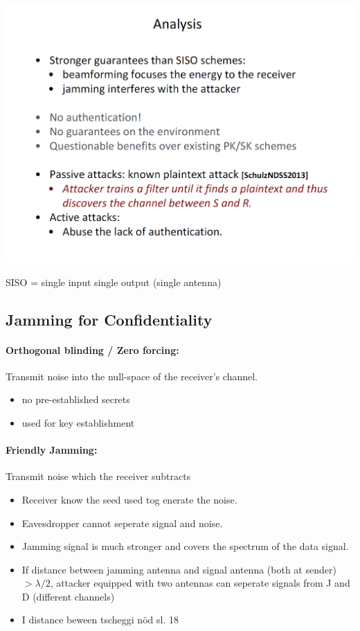 \begin{minipage}{\linewidth}
    \centering      
    \includegraphics[width=\linewidth]{Figures/L7_secrecy_analysis.PNG} 
\end{minipage}
SISO = single input single output (single antenna)

\subsection{Jamming for Confidentiality}

\paragraph{Orthogonal blinding / Zero forcing:}
Transmit noise into the null-space of the receiver's channel.
\begin{itemize}
    \item no pre-established secrets
    \item used for key establishment
\end{itemize}

\paragraph{Friendly Jamming:}
Transmit noise which the receiver subtracts
\begin{itemize}
    \item Receiver know the seed used tog enerate the noise.
    \item Eavesdropper cannot seperate signal and noise.
    \item Jamming signal is much stronger and covers the spectrum of the data signal.
    \item If distance between jamming antenna and signal antenna (both at sender) $> \lambda/2$, attacker equipped with two antennas can seperate signals from J and D (different channels)
    \item I distance beween tscheggi nöd sl. 18
\end{itemize}

